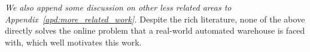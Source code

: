 \textit{We also append some discussion on other less related areas to Appendix~\ref{apd:more_related_work}.}
Despite the rich literature, none of the above directly solves the online problem that a real-world automated warehouse is faced with, which well motivates this work.